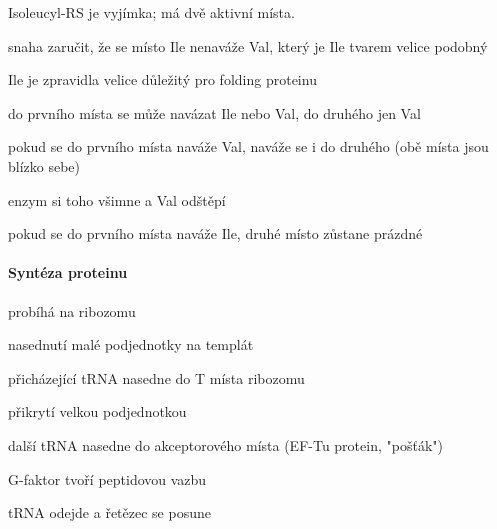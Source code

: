 \documentclass[DIV=8]{scrreprt}
\begin{document}
Isoleucyl-RS je vyjímka; má dvě ak­tivní mís­ta.
\begin{myItemize}[nosep]
    \item  snaha zaručit, že se místo Ile nenaváže Val, který je Ile tvarem velice podobný
\begin{myItemize}[nosep]
    \item Ile je zpravid­la velice důležitý pro fold­ing pro­teinu
\end{myItemize}

    \item do prvního místa se může navázat Ile nebo Val, do druhého jen Val
    \item pokud se do prvního místa naváže Val, naváže se i do druhého (obě místa jsou blízko sebe)
\begin{myItemize}[nosep]
    \item enzym si toho všimne a Val odštěpí
\end{myItemize}

    \item pokud se do prvního místa naváže Ile, druhé místo zůstane prázdné
\end{myItemize}



\paragraph{Syntéza proteinu}
\begin{myItemize}[nosep]
    \item probíhá na ribozomu
    \item nasednutí malé podjednotky na templát
    \item přicházející tRNA nasedne do T místa ribozomu
    \item přikrytí velkou podjednotkou
    \item další tRNA nasedne do akceptorového místa (EF-Tu protein, "pošťák")
    \item G-faktor tvoří peptidovou vazbu
    \item tRNA odejde a řetězec se posune
\end{myItemize}
\end{document}
